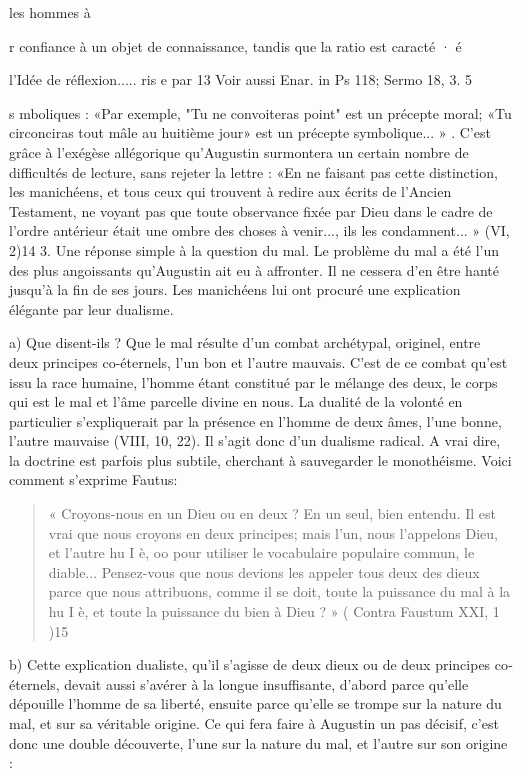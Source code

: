 les hommes à
 
r confiance à un objet de connaissance, tandis que la ratio est caracté · é
 
l'Idée de réflexion.....	ris e par
13 Voir aussi Enar. in Ps 118; Sermo 18, 3.
5
 

s mboliques : «Par exemple, "Tu ne convoiteras point" est un précepte moral; «Tu circonciras tout mâle au huitième jour» est un précepte symbolique... » . C'est grâce à l'exégèse allégorique qu'Augustin surmontera un certain nombre de difficultés de lecture, sans rejeter la lettre : «En ne faisant pas cette distinction, les manichéens, et tous ceux qui trouvent à redire aux écrits de l'Ancien Testament, ne voyant pas que toute observance fixée par Dieu dans le cadre de l'ordre antérieur était une ombre des choses à venir..., ils les condamnent... » (VI, 2)14
3.	Une réponse simple à la question du mal.
Le problème du mal a été l'un des plus angoissants qu'Augustin ait eu à affronter. Il ne cessera d'en être hanté jusqu'à la fin de ses jours. Les manichéens lui ont procuré une explication élégante par leur dualisme.

a)	Que disent-ils ? Que le mal résulte d'un combat archétypal, originel, entre deux  principes  co-éternels, l'un bon et l'autre mauvais. C'est de ce combat qu'est issu la race humaine, l'homme étant constitué par le mélange des deux, le corps qui est le mal et l'âme parcelle divine en nous. La dualité de la volonté en particulier s'expliquerait par la présence en l'homme de deux âmes, l'une bonne, l'autre mauvaise (VIII, 10, 22). Il s'agit donc d'un dualisme radical. A vrai dire, la doctrine est parfois plus subtile, cherchant à sauvegarder le monothéisme. Voici comment s'exprime Fautus:
\begin{quote}
« Croyons-nous en un Dieu ou en deux ? En un seul, bien entendu. Il est vrai que nous croyons en deux principes; mais l'un, nous l'appelons Dieu, et l'autre hu I è, oo pour utiliser le vocabulaire populaire commun, le diable... Pensez-vous que nous devions les appeler tous deux des dieux parce que nous attribuons, comme il se doit, toute la puissance du mal à la hu I è, et toute la puissance du bien à Dieu ? » ( Contra Faustum XXI, 1 )15     
\end{quote}


b)	Cette explication dualiste, qu'il s'agisse de deux dieux ou de deux principes co­ éternels, devait aussi s'avérer à la longue insuffisante, d'abord parce qu'elle dépouille l'homme de sa liberté, ensuite parce qu'elle se trompe sur la nature du mal, et sur sa véritable origine. Ce qui fera faire à Augustin un pas décisif, c'est donc une double découverte, l'une sur la nature du mal, et l'autre sur son origine :

